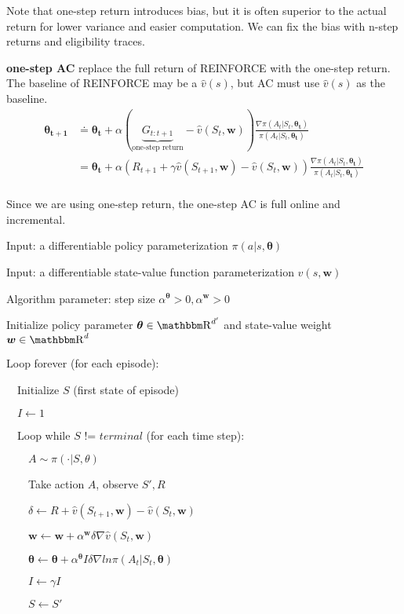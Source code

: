 \documentclass[sutton_barto_notes.tex]{subfiles}
\begin{document}
Note that one-step return introduces bias, but it is often superior to the actual return for lower variance and easier computation. We can fix the bias with n-step returns and eligibility traces.

\begin{definition}
\textbf{one-step AC} replace the full return of REINFORCE with the one-step return. The baseline of REINFORCE may be a $\hat{v}(s)$, but AC must use $\hat{v}(s)$ as the baseline.
\begin{align*}
\bm{\theta_{t+1}} &\doteq \bm{\theta_t} + \alpha (\underbrace{G_{t:t+1}}_{\text{one-step return}} - \hat{v}(S_t, \bm{w})) \frac{\nabla\pi(A_t|S_t,\bm{\theta_t})}{\pi(A_t|S_t,\bm{\theta_t})} \\
&= \bm{\theta_t} + \alpha (R_{t+1} + \gamma\hat{v}(S_{t+1},\bm{w}) - \hat{v}(S_t, \bm{w})) \frac{\nabla\pi(A_t|S_t,\bm{\theta_t})}{\pi(A_t|S_t,\bm{\theta_t})} \\
\end{align*}
\end{definition}

Since we are using one-step return, the one-step AC is full online and incremental.

\begin{tcolorbox}[width=1.1\textwidth,title={One-step Actor-Critic (episodic), for estimating $\pi_\theta\approx\pi_*$}]
Input: a differentiable policy parameterization $\pi(a|s,\bm{\theta})$

Input: a differentiable state-value function parameterization $\hat{v}(s,\bm{w})$

Algorithm parameter: step size $\alpha^{\bm{\theta}} > 0, \alpha^{\bm{w}} > 0$

Initialize policy parameter $\bm{\theta} \in \R^{d'}$ and state-value weight $\bm{w} \in \R^d$

Loop forever (for each episode):

$\quad$Initialize $S$ (first state of episode)

$\quad I \leftarrow 1$

$\quad$Loop while $S$ != $terminal$ (for each time step):

$\quad\quad A \sim \pi(\cdot | S, \theta)$

$\quad\quad$Take action $A$, observe $S', R$

$\quad\quad \delta\leftarrow R + \hat{v}(S_{t+1},\bm{w}) - \hat{v}(S_t, \bm{w})$

$\quad\quad \bm{w} \leftarrow \bm{w} + \alpha^{\bm{w}}\delta\nabla\hat{v}(S_t,\bm{w})$

$\quad\quad\bm{\theta}\leftarrow\bm{\theta}+\alpha^{\bm{\theta}} I \delta \nabla ln\pi(A_t | S_t, \bm{\theta})$

$\quad\quad I \leftarrow \gamma I$

$\quad\quad S \leftarrow S'$
\end{tcolorbox}
\end{document}
